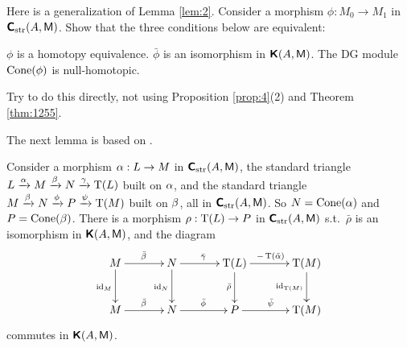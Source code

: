 \begin{exer} \label{exer:1255}
Here is a generalization of Lemma \ref{lem:2}. Consider a morphism 
$\phi : M_0 \to M_1$ in $\boldsymbol{\mathsf{C}}_{\mathrm{str}}(A, \operatorname{\mathsf{M}})$. Show that the three 
conditions below are equivalent:
\begin{enumerate}
 $\phi$ is a homotopy equivalence.
 $\bar{\phi}$ is an isomorphism in $\boldsymbol{\mathsf{K}}(A, \operatorname{\mathsf{M}})$.
 The DG module $\operatorname{Cone}(\phi)$ is null-homotopic.
\end{enumerate}
Try to do this directly, not using Proposition \ref{prop:4}(2) and Theorem 
\ref{thm:1255}.
\end{exer}

The next lemma is based on \cite[Lemma 1.4.2]{KaSc1}.

\begin{lem} \label{lem:1}
Consider a morphism $\alpha : L \to M$ in 
$\boldsymbol{\mathsf{C}}_{\mathrm{str}}(A, \operatorname{\mathsf{M}})$, 
the standard  triangle  
$L \xrightarrow{\alpha} M \xrightarrow{\beta} N \xrightarrow{\gamma} \operatorname{T}(L)$
built on $\alpha$, and the standard  triangle
$M \xrightarrow{\beta} N \xrightarrow{\phi} P \xrightarrow{\psi}  \operatorname{T}(M)$
built on $\beta$, all in $\boldsymbol{\mathsf{C}}_{\mathrm{str}}(A, \operatorname{\mathsf{M}})$. 
So $N = \operatorname{Cone}(\alpha)$ and $P = \operatorname{Cone}(\beta)$.
There is a morphism 
$\rho : \operatorname{T}(L) \to P$ in $\boldsymbol{\mathsf{C}}_{\mathrm{str}}(A, \operatorname{\mathsf{M}})$ s.t.\ 
$\bar{\rho}$ is an isomorphism in $\boldsymbol{\mathsf{K}}(A, \operatorname{\mathsf{M}})$, and the diagram 
\[ \UseTips \xymatrix @C=8ex @R=6ex { 
M
\ar[r]^{\bar{\be}}
\ar[d]_{\opn{id}_M}
&
N
\ar[r]^{\bar{\ga}}
\ar[d]_{\opn{id}_N}
& 
\opn{T}(L)
\ar[r]^{- \opn{T}(\bar{\al})}
\ar[d]_{\bar{\rho}}
&
\opn{T}(M)
\ar[d]_{\opn{id}_{\opn{T}(M)}}
\\
M
\ar[r]^{\bar{\be}}
&
N
\ar[r]^{\bar{\phi}}
& 
P
\ar[r]^{\bar{\psi}}
&
\opn{T}(M) 
} \]
commutes in $\boldsymbol{\mathsf{K}}(A, \operatorname{\mathsf{M}})$.
\end{lem}

